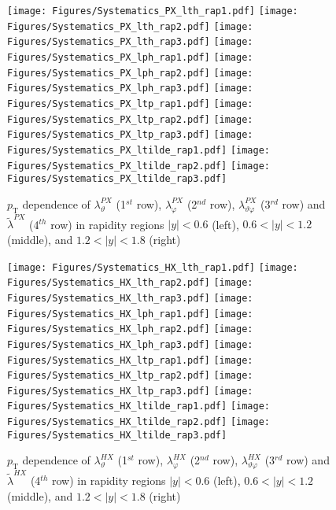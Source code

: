 \documentclass[12pt]{article}
\newcommand{\pT}{p_\mathrm{T}}
\newcommand{\absy}{\left |  y \right |}
\newcommand{\lamthHX}{\lambda^{\scriptscriptstyle HX}_\vartheta}
\newcommand{\lamphHX}{\lambda^{\scriptscriptstyle HX}_\varphi}
\newcommand{\lamthphHX}{\lambda^{\scriptscriptstyle HX}_{\vartheta \varphi}}
\newcommand{\lamtildeHX}{\tilde{\lambda}^{\scriptscriptstyle HX}}
\newcommand{\lamthPX}{\lambda^{\scriptscriptstyle PX}_\vartheta}
\newcommand{\lamphPX}{\lambda^{\scriptscriptstyle PX}_\varphi}
\newcommand{\lamthphPX}{\lambda^{\scriptscriptstyle PX}_{\vartheta \varphi}}
\newcommand{\lamtildePX}{\tilde{\lambda}^{\scriptscriptstyle PX}}
\begin{document}



\begin{figure}[htbp]
\centering
\texttt{[image: Figures/Systematics\_PX\_lth\_rap1.pdf]}
\texttt{[image: Figures/Systematics\_PX\_lth\_rap2.pdf]}
\texttt{[image: Figures/Systematics\_PX\_lth\_rap3.pdf]}
\texttt{[image: Figures/Systematics\_PX\_lph\_rap1.pdf]}
\texttt{[image: Figures/Systematics\_PX\_lph\_rap2.pdf]}
\texttt{[image: Figures/Systematics\_PX\_lph\_rap3.pdf]}
\texttt{[image: Figures/Systematics\_PX\_ltp\_rap1.pdf]}
\texttt{[image: Figures/Systematics\_PX\_ltp\_rap2.pdf]}
\texttt{[image: Figures/Systematics\_PX\_ltp\_rap3.pdf]}
\texttt{[image: Figures/Systematics\_PX\_ltilde\_rap1.pdf]}
\texttt{[image: Figures/Systematics\_PX\_ltilde\_rap2.pdf]}
\texttt{[image: Figures/Systematics\_PX\_ltilde\_rap3.pdf]}
\caption{$\pT$ dependence of $\lamthPX$
(1$^{st}$ row), $\lamphPX$ (2$^{nd}$ row), $\lamthphPX$ (3$^{rd}$ row) and 
$\lamtildePX$ (4$^{th}$ row) in rapidity regions $\absy<0.6$ (left),  
$0.6<\absy<1.2$ (middle), and $1.2<\absy<1.8$ (right)}
\end{figure}
\clearpage







\begin{figure}[htbp]
\centering
\texttt{[image: Figures/Systematics\_HX\_lth\_rap1.pdf]}
\texttt{[image: Figures/Systematics\_HX\_lth\_rap2.pdf]}
\texttt{[image: Figures/Systematics\_HX\_lth\_rap3.pdf]}
\texttt{[image: Figures/Systematics\_HX\_lph\_rap1.pdf]}
\texttt{[image: Figures/Systematics\_HX\_lph\_rap2.pdf]}
\texttt{[image: Figures/Systematics\_HX\_lph\_rap3.pdf]}
\texttt{[image: Figures/Systematics\_HX\_ltp\_rap1.pdf]}
\texttt{[image: Figures/Systematics\_HX\_ltp\_rap2.pdf]}
\texttt{[image: Figures/Systematics\_HX\_ltp\_rap3.pdf]}
\texttt{[image: Figures/Systematics\_HX\_ltilde\_rap1.pdf]}
\texttt{[image: Figures/Systematics\_HX\_ltilde\_rap2.pdf]}
\texttt{[image: Figures/Systematics\_HX\_ltilde\_rap3.pdf]}
\caption{$\pT$ dependence of $\lamthHX$
(1$^{st}$ row), $\lamphHX$ (2$^{nd}$ row), $\lamthphHX$ (3$^{rd}$ row) and 
$\lamtildeHX$ (4$^{th}$ row) in rapidity regions $\absy<0.6$ (left),  
$0.6<\absy<1.2$ (middle), and $1.2<\absy<1.8$ (right)}
\end{figure}
\clearpage
\end{document}
